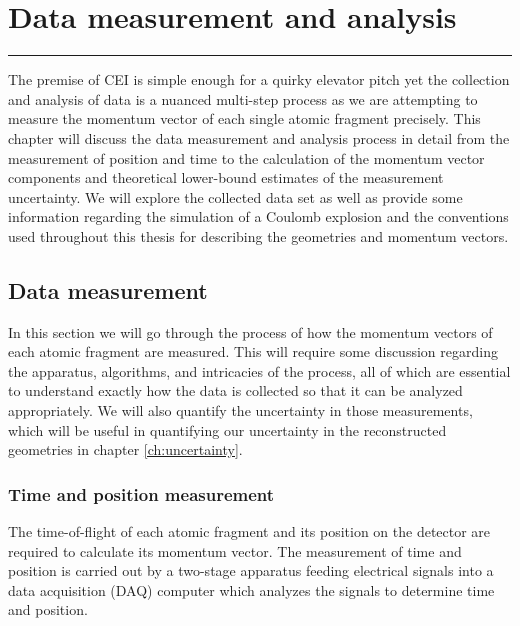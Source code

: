 \chapter{Data measurement and analysis} \label{ch:data}

\vspace{-1.5 em}
\begin{addmargin}[-0.5cm]{0cm}
  \minitoc
\end{addmargin}
\hrule
\vspace{1.5 em}

The premise of CEI is simple enough for a quirky elevator pitch yet the collection and analysis of data is a nuanced multi-step process as we are attempting to measure the momentum vector of each single atomic fragment precisely. This chapter will discuss the data measurement and analysis process in detail from the measurement of position and time to the calculation of the momentum vector components and theoretical lower-bound estimates of the measurement uncertainty. We will explore the collected data set as well as provide some information regarding the simulation of a Coulomb explosion and the conventions used throughout this thesis for describing the geometries and momentum vectors.

\section{Data measurement} \label{sec:measurement}
In this section we will go through the process of how the momentum vectors of each atomic fragment are measured. This will require some discussion regarding the apparatus, algorithms, and intricacies of the process, all of which are essential to understand exactly how the data is collected so that it can be analyzed appropriately. We will also quantify the uncertainty in those measurements, which will be useful in quantifying our uncertainty in the reconstructed geometries in chapter \ref{ch:uncertainty}.

\subsection{Time and position measurement}
The time-of-flight of each atomic fragment and its position on the detector are required to calculate its momentum vector. The measurement of time and position is carried out by a two-stage apparatus feeding electrical signals into a data acquisition (DAQ) computer which analyzes the signals to determine time and position.

